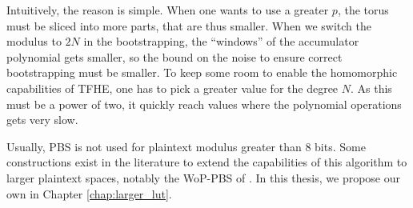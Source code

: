 Intuitively, the reason is simple. When one wants to use a greater $p$, the torus must be sliced into more parts, that are thus smaller. When we switch the modulus to $2N$ in the bootstrapping, the ``windows'' of the accumulator polynomial gets smaller, so the bound on the noise to ensure correct bootstrapping must be smaller. To keep some room to enable the homomorphic capabilities of TFHE, one has to pick a greater value for the degree $N$. As this must be a power of two, it quickly reach values where the polynomial operations gets very slow.

Usually, PBS is not used for plaintext modulus greater than 8 bits. Some constructions exist in the literature to extend the capabilities of this algorithm to larger plaintext spaces, notably the WoP-PBS of \cite{AC:CLOT21}. In this thesis, we propose our own in Chapter \ref{chap:larger_lut}.




